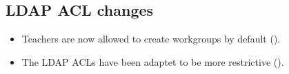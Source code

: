 \subsection{LDAP ACL changes}
\begin{itemize}
\item Teachers are now allowed to create workgroups by default ().
\item The LDAP ACLs have been adaptet to be more restrictive ().
\end{itemize}
 




%


